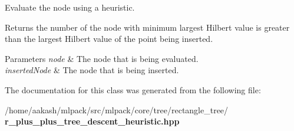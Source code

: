 Evaluate the node using a heuristic. 

Returns the number of the node with minimum largest Hilbert value is greater than the largest Hilbert value of the point being inserted.


\begin{DoxyParams}{Parameters}
{\em node} & The node that is being evaluated. \\
\hline
{\em inserted\+Node} & The node that is being inserted. \\
\hline
\end{DoxyParams}


The documentation for this class was generated from the following file\+:\begin{DoxyCompactItemize}
\item 
/home/aakash/mlpack/src/mlpack/core/tree/rectangle\+\_\+tree/\textbf{ r\+\_\+plus\+\_\+plus\+\_\+tree\+\_\+descent\+\_\+heuristic.\+hpp}\end{DoxyCompactItemize}
